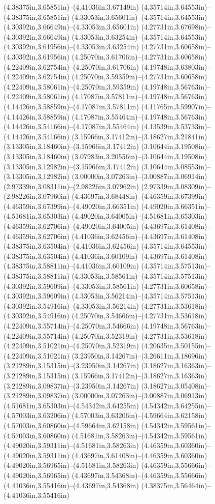 (4.38375in,3.65851in)--(4.41036in,3.67149in) (4.35714in,3.64553in)--(4.38375in,3.65851in) (4.33053in,3.65601in)--(4.35714in,3.64553in) (4.30392in,3.66649in)--(4.33053in,3.65601in) (4.27731in,3.67698in)--(4.30392in,3.66649in) (4.33053in,3.63254in)--(4.35714in,3.64553in) (4.30392in,3.61956in)--(4.33053in,3.63254in) (4.27731in,3.60658in)--(4.30392in,3.61956in) (4.25070in,3.61706in)--(4.27731in,3.60658in) (4.22409in,3.62754in)--(4.25070in,3.61706in) (4.19748in,3.63803in)--(4.22409in,3.62754in) (4.25070in,3.59359in)--(4.27731in,3.60658in) (4.22409in,3.58061in)--(4.25070in,3.59359in) (4.19748in,3.56763in)--(4.22409in,3.58061in) (4.17087in,3.57811in)--(4.19748in,3.56763in) (4.14426in,3.58859in)--(4.17087in,3.57811in) (4.11765in,3.59907in)--(4.14426in,3.58859in) (4.17087in,3.55464in)--(4.19748in,3.56763in) (4.14426in,3.54166in)--(4.17087in,3.55464in) (4.13539in,3.53733in)--(4.14426in,3.54166in) (3.15966in,3.17412in)--(3.18627in,3.21841in) (3.13305in,3.18460in)--(3.15966in,3.17412in) (3.10644in,3.19508in)--(3.13305in,3.18460in) (3.07983in,3.20556in)--(3.10644in,3.19508in) (3.13305in,3.12982in)--(3.15966in,3.17412in) (3.10644in,3.08553in)--(3.13305in,3.12982in) (3.00000in,3.07263in)--(3.00887in,3.06914in) (2.97339in,3.08311in)--(2.98226in,3.07962in) (2.97339in,3.08309in)--(2.98226in,3.07960in) (4.43697in,3.68448in)--(4.46359in,3.67399in) (4.46359in,3.67399in)--(4.49020in,3.66351in) (4.49020in,3.66351in)--(4.51681in,3.65303in) (4.49020in,3.64005in)--(4.51681in,3.65303in) (4.46359in,3.62706in)--(4.49020in,3.64005in) (4.43697in,3.61408in)--(4.46359in,3.62706in) (4.41036in,3.62456in)--(4.43697in,3.61408in) (4.38375in,3.63504in)--(4.41036in,3.62456in) (4.35714in,3.64553in)--(4.38375in,3.63504in) (4.41036in,3.60109in)--(4.43697in,3.61408in) (4.38375in,3.58811in)--(4.41036in,3.60109in) (4.35714in,3.57513in)--(4.38375in,3.58811in) (4.33053in,3.58561in)--(4.35714in,3.57513in) (4.30392in,3.59609in)--(4.33053in,3.58561in) (4.27731in,3.60658in)--(4.30392in,3.59609in) (4.33053in,3.56214in)--(4.35714in,3.57513in) (4.30392in,3.54916in)--(4.33053in,3.56214in) (4.27731in,3.53618in)--(4.30392in,3.54916in) (4.25070in,3.54666in)--(4.27731in,3.53618in) (4.22409in,3.55714in)--(4.25070in,3.54666in) (4.19748in,3.56763in)--(4.22409in,3.55714in) (4.25070in,3.52319in)--(4.27731in,3.53618in) (4.22409in,3.51021in)--(4.25070in,3.52319in) (4.20635in,3.50155in)--(4.22409in,3.51021in) (3.23950in,3.14267in)--(3.26611in,3.18696in) (3.21289in,3.15315in)--(3.23950in,3.14267in) (3.18627in,3.16363in)--(3.21289in,3.15315in) (3.15966in,3.17412in)--(3.18627in,3.16363in) (3.21289in,3.09837in)--(3.23950in,3.14267in) (3.18627in,3.05408in)--(3.21289in,3.09837in) (3.00000in,3.07263in)--(3.00887in,3.06913in) (4.51681in,3.65303in)--(4.54342in,3.64255in) (4.54342in,3.64255in)--(4.57003in,3.63206in) (4.57003in,3.63206in)--(4.59664in,3.62158in) (4.57003in,3.60860in)--(4.59664in,3.62158in) (4.54342in,3.59561in)--(4.57003in,3.60860in) (4.51681in,3.58263in)--(4.54342in,3.59561in) (4.49020in,3.59311in)--(4.51681in,3.58263in) (4.46359in,3.60360in)--(4.49020in,3.59311in) (4.43697in,3.61408in)--(4.46359in,3.60360in) (4.49020in,3.56965in)--(4.51681in,3.58263in) (4.46359in,3.55666in)--(4.49020in,3.56965in) (4.43697in,3.54368in)--(4.46359in,3.55666in) (4.41036in,3.55416in)--(4.43697in,3.54368in) (4.38375in,3.56464in)--(4.41036in,3.55416in) 